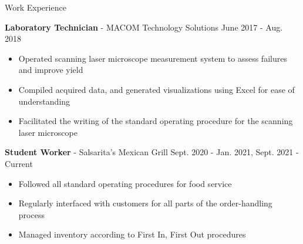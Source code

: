 \documentclass[UTF-8]{resume} \usepackage{multirow}
\begin{document}
        \begin{rSection}{Work Experience}
    	    \vspace{-1.25em}
        \item \textbf{Laboratory Technician} {- MACOM Technology Solutions} \hfill {June 2017 - Aug. 2018}
            \begin{itemize}
                \itemsep -5pt {}
                \item Operated scanning laser microscope measurement system to assess failures and improve yield
                \item Compiled acquired data, and generated visualizations using Excel for ease of understanding
                \item Facilitated the writing of the standard operating procedure for the scanning laser microscope
            \end{itemize}
        \item \textbf{Student Worker} {- Salsarita's Mexican Grill} \hfill {Sept. 2020 - Jan. 2021, Sept. 2021 - Current}
            \begin{itemize}
                \itemsep -5pt {}
                \item Followed all standard operating procedures for food service
                \item Regularly interfaced with customers for all parts of the order-handling process
                \item Managed inventory according to First In, First Out procedures
            \end{itemize}
        \end{rSection}
\end{document}
